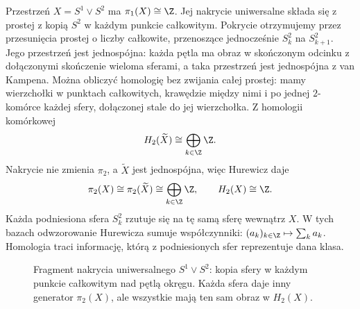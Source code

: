 \begin{przyklad}
\label{prz:pi-bukiet-pokrycie}
Przestrzeń
$X=S^1\vee S^2$
ma $\pi_1(X)\cong\Z$.
Jej nakrycie uniwersalne
składa się z prostej
z kopią $S^2$ w każdym
punkcie całkowitym.
Pokrycie otrzymujemy przez przesunięcia prostej o liczby całkowite,
przenoszące jednocześnie $S_k^2$ na $S_{k+1}^2$.
Jego przestrzeń jest jednospójna: każda pętla ma obraz
w skończonym odcinku z dołączonymi skończenie wieloma sferami,
a taka przestrzeń jest jednospójna z van Kampena.
Można obliczyć homologię bez zwijania całej prostej:
mamy wierzchołki w punktach całkowitych, krawędzie między nimi
i po jednej $2$-komórce każdej sfery, dołączonej stale do jej wierzchołka.
Z homologii komórkowej
\[
 H_2(\widetilde X)
 \cong\bigoplus_{k\in\Z}\Z.
\]
Nakrycie nie zmienia
$\pi_2$, a
$\widetilde X$
jest jednospójna,
więc Hurewicz daje
\[
 \pi_2(X)\cong
 \pi_2(\widetilde X)
 \cong\bigoplus_{k\in\Z}\Z,
 \qquad
 H_2(X)\cong\Z.
\]
Każda podniesiona
sfera $S_k^2$
rzutuje się
na tę samą sferę
wewnątrz $X$.
W tych bazach
odwzorowanie Hurewicza
sumuje współczynniki:
$(a_k)_{k\in\Z}
\mapsto\sum_k a_k$.
Homologia traci
informację, którą
z podniesionych
sfer reprezentuje
dana klasa.
\end{przyklad}

\begin{figure}[!htbp]
\centering
{}
\caption{Fragment nakrycia uniwersalnego
$S^1\vee S^2$: kopia sfery w każdym
punkcie całkowitym nad pętlą okręgu.
Każda sfera daje inny generator
$\pi_2(X)$, ale wszystkie mają
ten sam obraz w $H_2(X)$.}
\label{fig:nakrycie-bukiet-sfer}
\end{figure}

